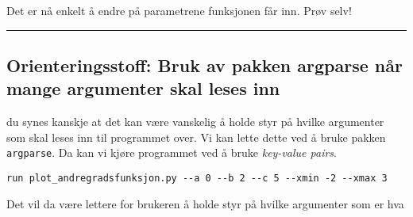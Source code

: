 \documentclass[11pt]{article}
\begin{document}
    Det er nå enkelt å endre på parametrene funksjonen får inn. Prøv selv!

    \begin{center}\rule{0.5\linewidth}{\linethickness}\end{center}

\hypertarget{orienteringsstoff-bruk-av-pakken-argparse-nuxe5r-mange-argumenter-skal-leses-inn}{%
\subsection{Orienteringsstoff: Bruk av pakken argparse når mange
argumenter skal leses
inn}\label{orienteringsstoff-bruk-av-pakken-argparse-nuxe5r-mange-argumenter-skal-leses-inn}}

du synes kanskje at det kan være vanskelig å holde styr på hvilke
argumenter som skal leses inn til programmet over. Vi kan lette dette
ved å bruke pakken \texttt{argparse}. Da kan vi kjøre programmet ved å
bruke \emph{key-value pairs}.

\texttt{run\ plot\_andregradsfunksjon.py\ -\/-a\ 0\ -\/-b\ 2\ -\/-c\ 5\ -\/-xmin\ -2\ -\/-xmax\ 3}

Det vil da være lettere for brukeren å holde styr på hvilke argumenter
som er hva
\end{document}
